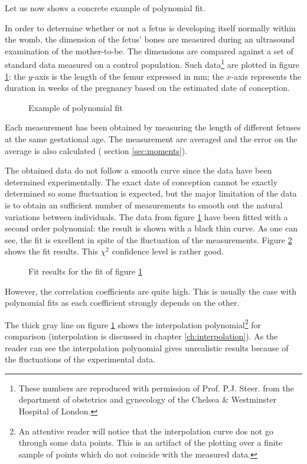 \documentclass[twoside]{book}
\begin{document}
\noindent Let us now shows a concrete example of polynomial fit.

In order to determine whether or not a fetus is developing itself
normally within the womb, the dimension of the fetus' bones are
measured during an ultrasound examination of the mother-to-be. The
dimensions are compared against a set of standard data measured on
a control population. Such data\footnote{These numbers are
reproduced with permission of Prof. P.J. Steer. from the
department of obstetrics and gynecology of the Chelsea $\&$
Westminster Hospital of London.} are plotted in figure
\ref{fig:femurLength}: the $y$-axis is the length of the femur
expressed in mm; the $x$-axis represents the duration in weeks of
the pregnancy based on the estimated date of conception.
\begin{figure}
\center{}
\caption{Example of polynomial fit} \label{fig:femurLength}
\end{figure}
Each measurement has been obtained by measuring the length of
different fetuses at the same gestational age. The measurement are
averaged and the error on the average is also calculated (\cf
section \ref{sec:moments}).

The obtained data do not follow a smooth curve since the data have
been determined experimentally. The exact date of conception
cannot be exactly determined so some fluctuation is expected, but
the major limitation of the data is to obtain an sufficient number
of measurements to smooth out the natural variations between
individuals. The data from figure \ref{fig:femurLength} have been
fitted with a second order polynomial: the result is shown with a
black thin curve. As one can see, the fit is excellent in spite of
the fluctuation of the measurements. Figure
\ref{fig:femurLengthResults} shows the fit results. This $\chi^2$
confidence level is rather good.
\begin{figure}[h]
\center{}
\caption{Fit results for the fit of figure \ref{fig:femurLength}
}\label{fig:femurLengthResults}
\end{figure}
However, the correlation coefficients are quite high. This is
usually the case with polynomial fits as each coefficient strongly
depends on the other.

The thick gray line on figure \ref{fig:femurLength} shows the
interpolation polynomial\footnote{An attentive reader will notice
that the interpolation curve dos not go through some data points.
This is an artifact of the plotting over a finite sample of points
which do not coincide with the measured data.} for comparison
(interpolation is discussed in chapter \ref{ch:interpolation}). As
the reader can see the interpolation polynomial gives unrealistic
results because of the fluctuations of the experimental data.
\end{document}
